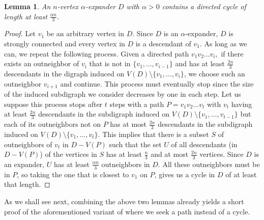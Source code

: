 \documentclass[english,11pt]{article}
\newtheorem{lemma}[theorem]{Lemma}
\theoremstyle{definition}
\numberwithin{equation}{section}
\numberwithin{figure}{section}
\begin{document}
\begin{lemma}\label{lem:long-cycles-in-expanders}
  An $n$-vertex $\alpha$-expander $D$ with $\alpha>0$ contains a directed cycle of length at least $\frac{\alpha n}{3}$.
\end{lemma}
\begin{proof}
Let $v_1$ be an arbitrary vertex in $D$. Since $D$ is an $\alpha$-expander, $D$ is strongly connected and every vertex in $D$ is a descendant of $v_1$. As long as we can, we repeat the following process. Given a directed path $v_1v_2\ldots v_i,$ if there exists an outneighbor of $v_i$ that is not in $\{v_1,\ldots, v_{i-1}\}$ and has at least $\frac{2n}{3}$ descendants in the digraph induced on $V(D) \setminus \{v_1,\ldots, v_{i}\}$, we choose such an outneighbor $v_{i+1}$ and continue. This process must eventually stop since the size of the induced subdigraph we consider decreases by one in each step. Let us suppose this process stops after $t$ steps with a path $P=v_1v_2\ldots v_t$ with $v_t$ having at least $\frac{2n}{3}$ descendants in the subdigraph induced on $V(D) \setminus \{v_1,\ldots, v_{t-1}\}$ but each of its outneighbors not on $P$ has at most $\frac{2n}{3}$ descendants in the subdigraph induced on $V(D) \setminus \{v_1,\ldots, v_{t}\}$. This implies that there is a subset $S$ of outneighbors of $v_t$ in $D-V(P)$ such that the set $U$ of all descendants (in $D-V(P)$) of the vertices in $S$ has at least $\frac{n}{3}$ and at most $\frac{2n}{3}$ vertices. 
Since $D$ is an expander, $U$ has at least $\frac{\alpha n}{3}$ outneighbors in $D$. All these outneighbors must be in $P$, so taking the one that is closest to $v_1$ on $P$, gives us a cycle in $D$ of at least that length.
\end{proof}

As we shall see next, combining the above two lemmas already yields a short proof of the aforementioned variant of  where we seek a path instead of a cycle.
\end{document}
